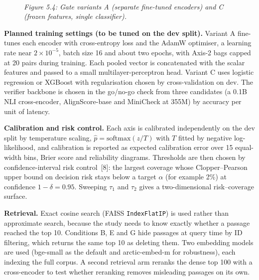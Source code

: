 \documentclass[12pt,a4paper]{article}
\begin{document}
\begin{figure}[t]
{}\\[4pt]
{\small\itshape Figure 5.4: Gate variants A (separate fine-tuned encoders) and C (frozen features, single classifier).}
\end{figure}

\textbf{Planned training settings (to be tuned on the dev split).} Variant A fine-tunes each encoder with cross-entropy loss and the AdamW optimiser, a learning rate near $2\times10^{-5}$, batch size 16 and about two epochs, with Axis-2 bags capped at 20 pairs during training. Each pooled vector is concatenated with the scalar features and passed to a small multilayer-perceptron head. Variant C uses logistic regression or XGBoost with regularisation chosen by cross-validation on dev. The verifier backbone is chosen in the go/no-go check from three candidates (a 0.1B NLI cross-encoder, AlignScore-base and MiniCheck at 355M) by accuracy per unit of latency.

\textbf{Calibration and risk control.} Each axis is calibrated independently on the dev split by temperature scaling, $\hat p=\mathrm{softmax}(z/T)$ with $T$ fitted by negative log-likelihood, and calibration is reported as expected calibration error over 15 equal-width bins, Brier score and reliability diagrams. Thresholds are then chosen by confidence-interval risk control~[8]: the largest coverage whose Clopper--Pearson upper bound on decision risk stays below a target $\alpha$ (for example 2\%) at confidence $1-\delta=0.95$. Sweeping $\tau_1$ and $\tau_2$ gives a two-dimensional risk--coverage surface.

\textbf{Retrieval.} Exact cosine search (FAISS \texttt{IndexFlatIP}) is used rather than approximate search, because the study needs to know exactly whether a passage reached the top 10. Conditions B, E and G hide passages at query time by ID filtering, which returns the same top 10 as deleting them. Two embedding models are used (bge-small as the default and arctic-embed-m for robustness), each indexing the full corpus. A second retrieval arm reranks the dense top 100 with a cross-encoder to test whether reranking removes misleading passages on its own.
\end{document}
